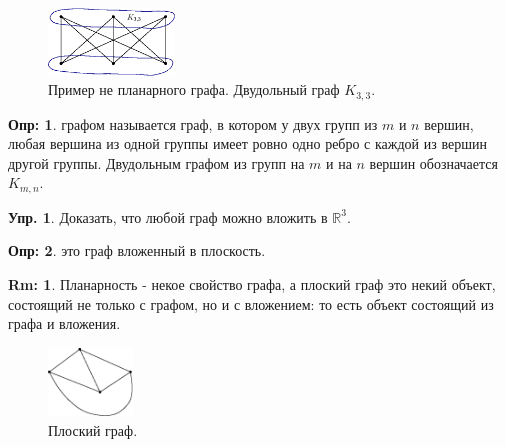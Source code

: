 \documentclass[12pt]{article}
\newcommand{\MR}{\mathbb{R}}
\theoremstyle{definition}
\newtheorem{defn}{Опр:}
\newtheorem{rem}{Rm:}
\newtheorem{exrc}{Упр.}
\begin{document}
\begin{figure}[H]
	\centering
	\includegraphics[width=0.3\textwidth]{GATL2_5.eps}
	\caption{Пример не планарного графа. Двудольный граф $K_{3,3}$.}
	\label{2_5}
\end{figure}

\begin{defn}
	 графом называется граф, в котором у двух групп из $m$ и $n$ вершин, любая вершина из одной группы имеет ровно одно ребро с каждой из вершин другой группы. Двудольным графом из групп на $m$ и на $n$ вершин обозначается $K_{m,n}$. 
\end{defn}

\begin{exrc}
	Доказать, что любой граф можно вложить в $\MR^3$.
\end{exrc}

\begin{defn}
	 это граф вложенный в плоскость.
\end{defn}
\begin{rem}
	Планарность - некое свойство графа, а плоский граф это некий объект, состоящий не только с графом, но и с вложением: то есть объект состоящий из графа и вложения.
\end{rem}
\begin{figure}[H]
	\centering
	\includegraphics[width=0.2\textwidth]{GATL2_6.eps}
	\caption{Плоский граф.}
	\label{2_6}
\end{figure}
\end{document}
